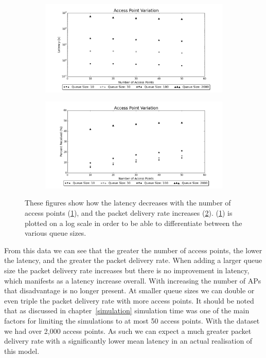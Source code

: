         \begin{figure}
            \centering
            \begin{subfigure}{\textwidth}
                \centering
                \includegraphics[width=\linewidth]{./images/Access_Point_Latency.png}
                \caption{}
                \label{fig:num_aps_latency}
            \end{subfigure}
            \begin{subfigure}{\textwidth}
                \includegraphics[width=\linewidth]{./images/Access_Point_Received.png}
                \caption{}
                \label{fig:num_aps_received}
            \end{subfigure}
            \caption{These figures show how the latency decreases with the number of access points (\ref{fig:num_aps_latency}), and the packet delivery rate increases (\ref{fig:num_aps_received}). (\ref{fig:num_aps_latency}) is plotted on a log scale in order to be able to differentiate between the various queue sizes.}
            \label{fig:num_aps}
        \end{figure}

        From this data we can see that the greater the number of access points, the lower the latency, and the greater the packet delivery rate. When adding a larger queue size the packet delivery rate increases but there is no improvement in latency, which manifests as a latency increase overall. With increasing the number of APs that disadvantage is no longer present. At smaller queue sizes we can double or even triple the packet delivery rate with more access points. It should be noted that as discussed in chapter~\ref{simulation} simulation time was one of the main factors for limiting the simulations to at most 50 access points. With the dataset we had over 2,000 access points. As such we can expect a much greater packet delivery rate with a significantly lower mean latency in an actual realisation of this model. 


